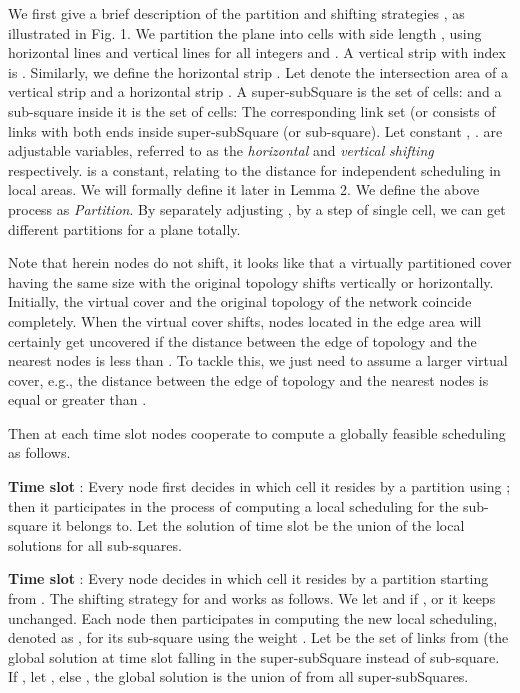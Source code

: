 \documentclass[journal]{IEEEtran}
\begin{document}
We first give a brief description of the partition and shifting strategies \cite{S:pick2}, as illustrated in Fig. 1.
We partition the plane into cells with side length , using horizontal lines  and vertical lines  for all integers  and . A vertical strip with index  is . Similarly, we define the horizontal strip . Let  denote the intersection area of a vertical strip  and a horizontal strip .
A super-subSquare is the set of cells: 
and a sub-square inside it is the set of cells:
The corresponding link set  (or  consists of links with both ends inside super-subSquare (or sub-square).
Let constant , .  are adjustable variables, referred to as the
\emph{horizontal} and \emph{vertical} \emph{shifting} respectively.  is a constant, relating to the distance for independent  scheduling in local areas. We will formally define it later in Lemma 2.  We define the above process as \emph{Partition}. By separately adjusting ,   by a step of single cell, we can get  different partitions for a plane totally.

Note that herein nodes do not shift, it looks like that a virtually partitioned cover having the same size with the original topology shifts vertically or horizontally. Initially, the virtual cover and the original topology of the network coincide completely. When the virtual cover shifts, nodes located in the edge area will certainly get uncovered if the distance between the edge of topology and the nearest nodes is less than . To tackle this, we just need to assume a larger virtual cover, e.g., the distance between the edge of topology and the nearest nodes is equal or greater than .

Then at each time slot nodes cooperate to compute a globally feasible scheduling as follows.

\textbf{Time slot } : Every node first decides in which cell it
resides by a partition using ; then it
participates in the process of computing a local scheduling  for
the sub-square it belongs to. Let the solution  of time
slot  be the union of the local solutions  for all sub-squares.

\textbf{Time slot} : Every node decides in which cell
it resides by a partition starting from . The shifting strategy for  and  works as follows. We let  and  if , or it keeps unchanged. Each node then participates in computing the new local scheduling, denoted as ,
for its sub-square using the weight . Let  be the set of links from (the global solution at time slot  falling in the super-subSquare instead of sub-square. If , let , else , the global solution is the union
of  from all super-subSquares.
\end{document}
